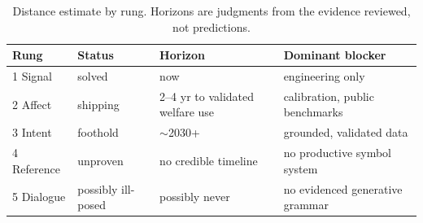 \begin{table}[htbp]
\centering
\caption{Distance estimate by rung. Horizons are judgments from the
evidence reviewed, not predictions.}
\label{tab:distance}
\footnotesize
\setlength{\tabcolsep}{4pt}
\begin{tabular}{@{}p{2.7cm}p{2.5cm}p{4.0cm}p{3.6cm}@{}}
\toprule
\textbf{Rung} & \textbf{Status} & \textbf{Horizon} & \textbf{Dominant blocker} \\
\midrule
1 Signal & solved & now & engineering only \\
2 Affect & shipping & 2--4 yr to validated welfare use & calibration, public benchmarks \\
3 Intent & foothold & $\sim$2030+ & grounded, validated data \\
4 Reference & unproven & no credible timeline & no productive symbol system \\
5 Dialogue & possibly ill-posed & possibly never & no evidenced generative grammar \\
\bottomrule
\end{tabular}
\end{table}
